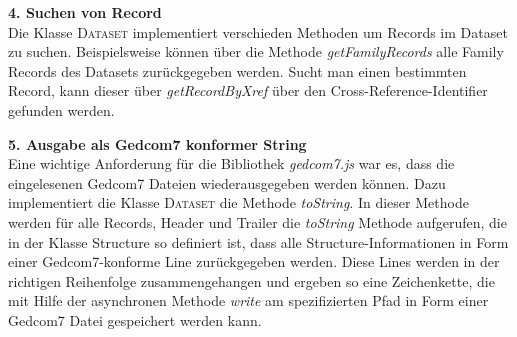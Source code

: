 \vspace{1em}
\textbf{4. Suchen von Record} \vspace{0.5em} \\
Die Klasse \textsc{Dataset} implementiert verschieden Methoden um Records im Dataset zu suchen. Beispielsweise können über die Methode \textit{getFamilyRecords} alle Family Records des Datasets zurückgegeben werden. Sucht man einen bestimmten Record, kann dieser über \textit{getRecordByXref} über den Cross-Reference-Identifier gefunden werden. 

\vspace{1em}
\textbf{5. Ausgabe als Gedcom7 konformer String} \vspace{0.5em} \\
Eine wichtige Anforderung für die Bibliothek \textit{gedcom7.js} war es, dass die eingelesenen Gedcom7 Dateien wiederausgegeben werden können. Dazu implementiert die Klasse \textsc{Dataset} die Methode \textit{toString}. In dieser Methode werden für alle Records, Header und Trailer die \textit{toString} Methode aufgerufen, die in der Klasse Structure so definiert ist, dass alle Structure-Informationen in Form einer Gedcom7-konforme Line zurückgegeben werden. Diese Lines werden in der richtigen Reihenfolge zusammengehangen und ergeben so eine Zeichenkette, die mit Hilfe der asynchronen Methode \textit{write} am spezifizierten Pfad in Form einer Gedcom7 Datei gespeichert werden kann.

